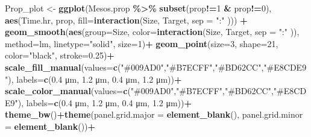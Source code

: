 \documentclass[
]{article}
\newenvironment{Shaded}{\begin{snugshade}}{\end{snugshade}}
\newcommand{\AttributeTok}[1]{\textcolor[rgb]{0.13,0.29,0.53}{#1}}
\newcommand{\DecValTok}[1]{\textcolor[rgb]{0.00,0.00,0.81}{#1}}
\newcommand{\FloatTok}[1]{\textcolor[rgb]{0.00,0.00,0.81}{#1}}
\newcommand{\FunctionTok}[1]{\textcolor[rgb]{0.13,0.29,0.53}{\textbf{#1}}}
\newcommand{\NormalTok}[1]{#1}
\newcommand{\OtherTok}[1]{\textcolor[rgb]{0.56,0.35,0.01}{#1}}
\newcommand{\SpecialCharTok}[1]{\textcolor[rgb]{0.81,0.36,0.00}{\textbf{#1}}}
\newcommand{\StringTok}[1]{\textcolor[rgb]{0.31,0.60,0.02}{#1}}
\begin{document}
\begin{Shaded}
\begin{Highlighting}[]
\NormalTok{Prop\_plot }\OtherTok{\textless{}{-}} \FunctionTok{ggplot}\NormalTok{(Mesos.prop }\SpecialCharTok{\%\textgreater{}\%} \FunctionTok{subset}\NormalTok{(prop}\SpecialCharTok{!=}\DecValTok{1} \SpecialCharTok{\&}\NormalTok{ prop}\SpecialCharTok{!=}\DecValTok{0}\NormalTok{), }\FunctionTok{aes}\NormalTok{(Time.hr, prop, }\AttributeTok{fill=}\FunctionTok{interaction}\NormalTok{(Size, Target, }\AttributeTok{sep =} \StringTok{":"}\NormalTok{ ))) }\SpecialCharTok{+}
  \FunctionTok{geom\_smooth}\NormalTok{(}\FunctionTok{aes}\NormalTok{(}\AttributeTok{group=}\NormalTok{Size, }\AttributeTok{color=}\FunctionTok{interaction}\NormalTok{(Size, Target, }\AttributeTok{sep =} \StringTok{":"}\NormalTok{ )), }
                \AttributeTok{method=}\StringTok{\textquotesingle{}lm\textquotesingle{}}\NormalTok{, }\AttributeTok{linetype=}\StringTok{"solid"}\NormalTok{, }\AttributeTok{size=}\DecValTok{1}\NormalTok{)}\SpecialCharTok{+}
  \FunctionTok{geom\_point}\NormalTok{(}\AttributeTok{size=}\DecValTok{3}\NormalTok{, }\AttributeTok{shape=}\DecValTok{21}\NormalTok{, }\AttributeTok{color=}\StringTok{"black"}\NormalTok{, }\AttributeTok{stroke=}\FloatTok{0.25}\NormalTok{)}\SpecialCharTok{+}
  \FunctionTok{scale\_fill\_manual}\NormalTok{(}\AttributeTok{values=}\FunctionTok{c}\NormalTok{(}\StringTok{"\#009AD0"}\NormalTok{,}\StringTok{"\#B7ECFF"}\NormalTok{,}\StringTok{"\#BD62CC"}\NormalTok{,}\StringTok{"\#E8CDE9"}\NormalTok{), }
                    \AttributeTok{labels=}\FunctionTok{c}\NormalTok{(}\StringTok{\textquotesingle{}0.4 μm\textquotesingle{}}\NormalTok{, }\StringTok{\textquotesingle{}1.2 μm\textquotesingle{}}\NormalTok{, }\StringTok{\textquotesingle{}0.4 μm\textquotesingle{}}\NormalTok{, }\StringTok{\textquotesingle{}1.2 μm\textquotesingle{}}\NormalTok{))}\SpecialCharTok{+}
  \FunctionTok{scale\_color\_manual}\NormalTok{(}\AttributeTok{values=}\FunctionTok{c}\NormalTok{(}\StringTok{"\#009AD0"}\NormalTok{,}\StringTok{"\#B7ECFF"}\NormalTok{,}\StringTok{"\#BD62CC"}\NormalTok{,}\StringTok{"\#E8CDE9"}\NormalTok{), }
                    \AttributeTok{labels=}\FunctionTok{c}\NormalTok{(}\StringTok{\textquotesingle{}0.4 μm\textquotesingle{}}\NormalTok{, }\StringTok{\textquotesingle{}1.2 μm\textquotesingle{}}\NormalTok{, }\StringTok{\textquotesingle{}0.4 μm\textquotesingle{}}\NormalTok{, }\StringTok{\textquotesingle{}1.2 μm\textquotesingle{}}\NormalTok{))}\SpecialCharTok{+}
  \FunctionTok{theme\_bw}\NormalTok{()}\SpecialCharTok{+}\FunctionTok{theme}\NormalTok{(}\AttributeTok{panel.grid.major =} \FunctionTok{element\_blank}\NormalTok{(), }\AttributeTok{panel.grid.minor =} \FunctionTok{element\_blank}\NormalTok{())}\SpecialCharTok{+}

\end{Highlighting}
\end{Shaded}
\end{document}
